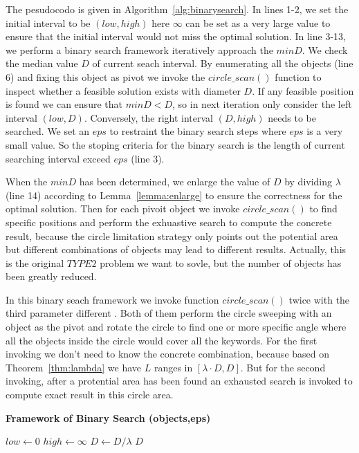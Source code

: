 \documentclass{sig-alternate}
\newcounter{example}[section]
\begin{document}
The pesudocodo is given in Algorithm~\ref{alg:binarysearch}. In lines 1-2,
we set the initial interval to be $(low, high)$ here $\infty$ can be set as a very
large value to ensure that the initial interval would not miss the optimal solution.
In line 3-13, we perform a binary search framework iteratively approach the $minD$.
We check the median value $D$ of current seach interval. By enumerating all the objects (line 6)
and fixing this object as pivot we invoke the $circle\_scan()$ function
to inspect whether a feasible solution exists with diameter $D$.
If any feasible position is found we can ensure that $minD < D$, so in next iteration
only consider the left interval $(low,D)$. Conversely, the right interval $(D,high)$
needs to be searched. We set an $eps$ to restraint the binary search steps where
$eps$ is a very small value. So the stoping criteria for the binary search is the length
of current searching interval exceed $eps$ (line 3). 

When the $minD$ has been determined, we enlarge the value of $D$ by dividing $\lambda$
(line 14) according to Lemma~\ref{lemma:enlarge} to ensure the correctness for the optimal
solution. Then for each pivoit object we invoke $circle\_scan()$ to find specific positions and perform
the exhuastive search to compute the concrete result, because the circle limitation strategy
only points out the potential area but different combinations of objects may lead to
different results. Actually, this is the original $TYPE2$ problem we want to sovle, but
the number of objects has been greatly reduced.


In this binary seach framework
we invoke function $circle\_scan()$ twice with the third parameter different .
Both of them perform the circle sweeping with an object as the pivot and rotate the
circle to find one or more specific angle where all the objects inside the circle would
cover all the keywords. For the first invoking we don't need to
know the concrete combination, because based on Theorem~\ref{thm:lambda} we have
$L$ ranges in $[\lambda\cdot D, D]$.
But for the second invoking, after a protential area has been found
an exhausted search is invoked to compute exact result in this circle area.

\begin{algorithm}[!ht]\small\label{alg:binarysearch}
\caption{ \bf {Framework of Binary Search} (objects,eps)}

$low \gets 0$\;
$high \gets \infty$\;
$D \gets D/\lambda$\;
\Return $D$\;\vspace{-1ex}

\end{algorithm}
\end{document}
